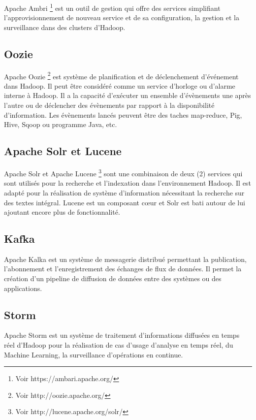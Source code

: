 \documentclass[12pt,english]{book}
\begin{document}
Apache Ambri \footnote{Voir https://ambari.apache.org/} est un outil de gestion qui offre des services simplifiant l’approvisionnement de nouveau service et de sa configuration, la gestion et la surveillance dans des clusters d’Hadoop.

\subsection{Oozie}

Apache Oozie \footnote{Voir http://oozie.apache.org/} est système de planification et de déclenchement d’événement dans Hadoop. Il peut être considéré comme un service d’horloge ou d’alarme interne à Hadoop. Il a la capacité d’exécuter un ensemble d’évènements une après l’autre ou de déclencher des évènements par rapport à la disponibilité d’information. Les évènements lancés peuvent être des taches map-reduce, Pig, Hive, Sqoop ou programme Java, etc. 

\subsection{Apache Solr et Lucene}

Apache Solr et Apache Lucene \footnote{Voir http://lucene.apache.org/solr/} sont une combinaison de deux (2) services qui sont utilisés pour la recherche et l’indexation dans l’environnement Hadoop.  Il est adapté pour la réalisation de système d’information nécessitant la recherche sur des textes intégral. Lucene est un composant cœur et Solr est bati autour de lui ajoutant encore plus de fonctionnalité.  

\subsection{Kafka}

Apache Kalka est un système de messagerie distribué permettant la publication, l’abonnement et l’enregistrement des échanges de flux de données. Il permet la création d’un pipeline de diffusion de données entre des systèmes ou des applications. 

\subsection{Storm}

Apache Storm est un système de traitement d’informations diffusées en temps réel d’Hadoop pour la réalisation de cas d’usage d’analyse en temps réel, du Machine Learning, la surveillance d’opérations en continue.
\end{document}
